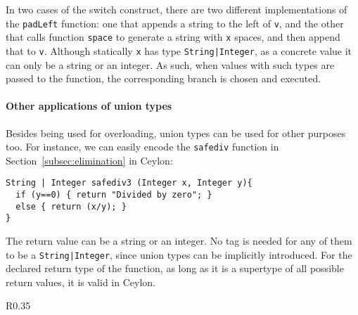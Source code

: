 \noindent In two cases of the switch construct, there are two different implementations
of the \lstinline{padLeft} function: one that appends a string to the left of \lstinline{v},
and the other that calls function \lstinline{space} to generate a string with \lstinline{x} spaces,
and then append that to \lstinline{v}.
Although statically \lstinline{x} has type \lstinline{String|Integer}, as a concrete value
it can only be a string or an integer.
As such, when values with such types are passed to the function,
the corresponding branch is chosen and executed.

\paragraph{Other applications of union types}
Besides being used for overloading, union types can be used for other purposes too.
For instance, we can easily encode the \lstinline{safediv} function in Section~\ref{subsec:elimination}
in Ceylon:
%
\begin{lstlisting}
String | Integer safediv3 (Integer x, Integer y){
  if (y==0) { return "Divided by zero"; }
  else { return (x/y); }
}
\end{lstlisting}
%
The return value can be a string or an integer.
No tag is needed for any of them to be a \lstinline{String|Integer},
since union types can be implicitly introduced.
For the declared return type of the function, as long as it is
a supertype of all possible return values, it is valid
in Ceylon.

\begin{wrapfigure}{R}{0.35\textwidth}
\begin{center}
\end{center}
\end{wrapfigure}

